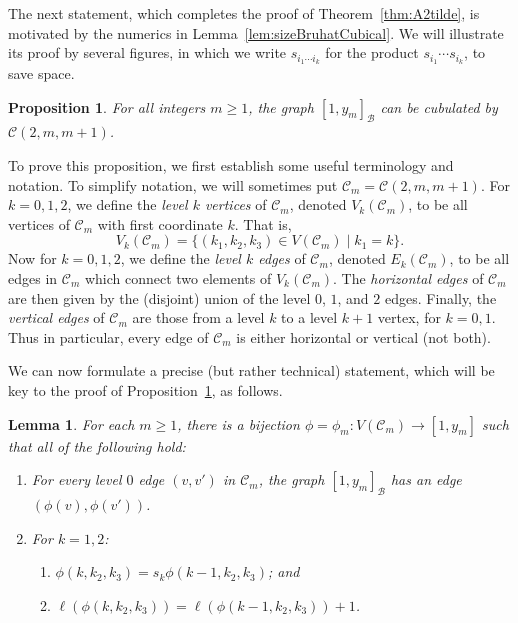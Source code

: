\documentclass[11pt]{amsart}
\theoremstyle{plain}
\newtheorem{prop}[thm]{Proposition}
\newtheorem{lemma}[thm]{Lemma}
\theoremstyle{definition}
\newcommand{\cC}{\mathcal{C}}
\newcommand{\cB}{\mathcal B}
\numberwithin{equation}{subsection}
\begin{document}
The next statement, which completes the proof of Theorem~\ref{thm:A2tilde}, is motivated by the numerics in Lemma~\ref{lem:sizeBruhatCubical}. We will illustrate its proof by several figures, in which we write $s_{i_1 \cdots i_k}$ for the product $s_{i_1} \cdots s_{i_k}$, to save space.


\begin{prop}\label{prop:infinite} For all integers $m \geq 1$, the graph $[1,y_m]_\cB$ can be cubulated by $\cC(2,m,m+1)$.
\end{prop}

To prove this proposition, we first establish some useful terminology and notation. To simplify notation, we will sometimes put $\cC_m = \cC(2,m,m+1)$.  
For $k = 0,1,2$, we define the \emph{level $k$ vertices} of $\cC_m$, denoted $V_k(\cC_m)$,  to be all  vertices of $\cC_m$ with first coordinate $k$. That is,
\[
V_k(\cC_m) = \{ (k_1, k_2, k_3) \in V(\cC_m) \mid k_1 = k \}.
\]
Now for $k = 0,1,2$,  we define the  \emph{level $k$ edges} of $\cC_m$, denoted $E_k(\cC_m)$, to be all edges in $\cC_m$ which connect two elements of $V_k(\cC_m)$. The \emph{horizontal edges} of $\cC_m$ are then given by the (disjoint) union of the level $0$, $1$, and $2$ edges. Finally, the \emph{vertical edges} of $\cC_m$ are those from a level $k$ to a level $k + 1$ vertex, for $k = 0,1$. Thus in particular, every edge of $\cC_m$ is either horizontal or vertical (not both).

We can now formulate a precise (but rather technical) statement, which will be key to the proof of Proposition~\ref{prop:infinite}, as follows. 

\begin{lemma}\label{lem:label} 
For each $m \geq 1$, there is a bijection $\phi = \phi_m : V(\cC_m) \to [1,y_m]$ such that all of the following hold:
\begin{enumerate}
\item For every level $0$ edge $(v,v')$ in $\cC_m$, the graph $[1,y_m]_\cB$ has an edge $(\phi(v),\phi(v'))$.
\item For $k = 1,2$:
\begin{enumerate}
\item $\phi(k,k_2,k_3) = s_k \phi(k-1,k_2,k_3)$; and
\item $\ell(\phi(k,k_2,k_3)) = \ell(\phi(k-1,k_2,k_3)) + 1$.
\end{enumerate}
\end{enumerate}
\end{lemma}
\end{document}
